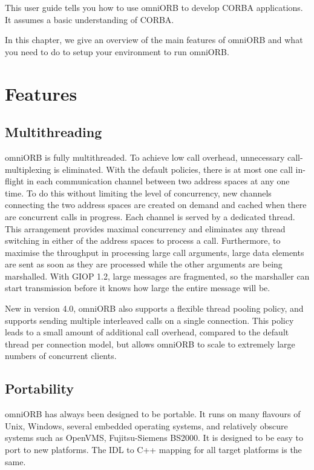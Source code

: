 \documentclass[11pt,twoside,a4paper]{book}
\begin{document}
This user guide tells you how to use omniORB to develop CORBA
applications. It assumes a basic understanding of CORBA.

In this chapter, we give an overview of the main features of omniORB
and what you need to do to setup your environment to run omniORB.

\section{Features}

\subsection{Multithreading}

omniORB is fully multithreaded. To achieve low call overhead,
unnecessary call-multiplexing is eliminated. With the default
policies, there is at most one call in-flight in each communication
channel between two address spaces at any one time. To do this without
limiting the level of concurrency, new channels connecting the two
address spaces are created on demand and cached when there are
concurrent calls in progress. Each channel is served by a dedicated
thread. This arrangement provides maximal concurrency and eliminates
any thread switching in either of the address spaces to process a
call. Furthermore, to maximise the throughput in processing large call
arguments, large data elements are sent as soon as they are processed
while the other arguments are being marshalled. With GIOP 1.2, large
messages are fragmented, so the marshaller can start transmission
before it knows how large the entire message will be.

New in version 4.0, omniORB also supports a flexible thread pooling
policy, and supports sending multiple interleaved calls on a single
connection. This policy leads to a small amount of additional call
overhead, compared to the default thread per connection model, but
allows omniORB to scale to extremely large numbers of concurrent
clients.

\subsection{Portability}

omniORB has always been designed to be portable. It runs on many
flavours of Unix, Windows, several embedded operating systems, and
relatively obscure systems such as OpenVMS, Fujitsu-Siemens BS2000.
It is designed to be easy to port to new platforms. The IDL to C++
mapping for all target platforms is the same.
\end{document}
